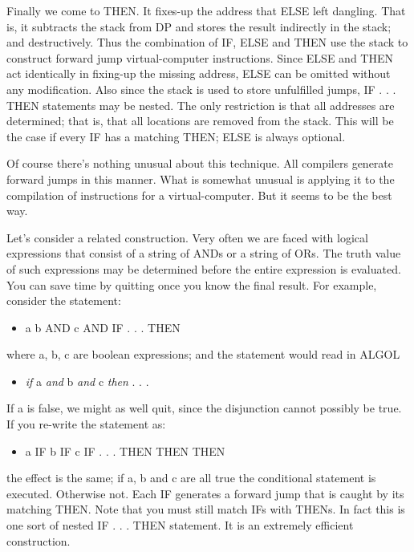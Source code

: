 \documentclass[b5paper, oneside]{book}
\begin{document}
Finally we come to THEN. It fixes-up the address that ELSE left dangling. That is, it subtracts the stack from DP and stores the result indirectly in the stack; and destructively. Thus the combination of IF, ELSE and THEN use the stack to construct forward jump virtual-computer instructions. Since ELSE and THEN act identically in fixing-up the missing address, ELSE can be omitted without any modification. Also since the stack is used to store unfulfilled jumps, IF . . . THEN statements may be nested. The only restriction is that all addresses are determined; that is, that all locations are removed from the stack. This will be the case if every IF has a matching THEN; ELSE is always optional.

Of course there's nothing unusual about this technique. All compilers generate forward jumps in this manner. What is somewhat unusual is applying it to the compilation of instructions for a virtual-computer. But it seems to be the best way.

Let's consider a related construction. Very often we are faced with logical expressions that consist of a string of ANDs or a string of ORs. The truth value of such expressions may be determined before the entire expression is evaluated. You can save time by quitting once you know the final result. For example, consider the statement:\begin{itemize}
   \item a b AND c AND IF . . . THEN\end{itemize}
where a, b, c are boolean expressions; and the statement would read in ALGOL\begin{itemize}
   \item {\em if} a {\em and} b {\em and} c {\em then} . . .\end{itemize}
If a is false, we might as well quit, since the disjunction cannot possibly be true. If you re-write the statement as:\begin{itemize}
   \item a IF b IF c IF . . . THEN THEN THEN\end{itemize}
the effect is the same; if a, b and c are all true the conditional statement is executed. Otherwise not. Each IF generates a forward jump that is caught by its matching THEN. Note that you must still match IFs with THENs. In fact this is one sort of nested IF . . . THEN statement. It is an extremely efficient construction.
\end{document}
